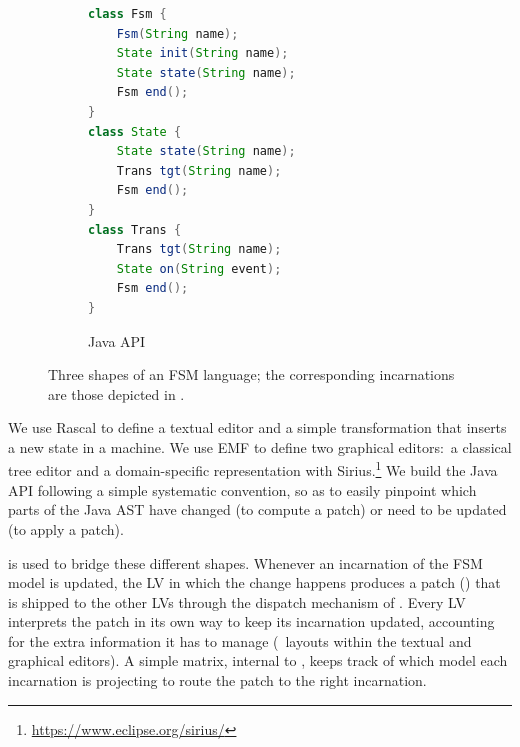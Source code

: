 \begin{figure}[bt]
	\enskip
	\vrule
	\enskip
	\begin{subfigure}[t]{.35\columnwidth}
		\vskip 0pt
		\begin{lstlisting}[label=lst:fsm-api, language=Java, numbers=none, xleftmargin=0pt, tabsize=1, aboveskip=0pt, belowskip=0pt, abovecaptionskip=0pt]
class Fsm {
	Fsm(String name);
	State init(String name);
	State state(String name);
	Fsm end();
}
class State {
	State state(String name);
	Trans tgt(String name);
	Fsm end();
}
class Trans {
	Trans tgt(String name);
	State on(String event);
	Fsm end();
}
		\end{lstlisting}
		\caption{Java API}
	\end{subfigure}
	\caption{Three shapes of an FSM language; the corresponding incarnations are those depicted in .}
	\label{fig:3fsms}
\end{figure}

We use Rascal to define a textual editor and a simple transformation that inserts a new state in a machine.
We use EMF to define two graphical editors:~a classical tree editor and a domain-specific representation with Sirius.\footnote{\url{https://www.eclipse.org/sirius/}}
We build the Java API following a simple systematic convention, so as to easily pinpoint which parts of the Java AST have changed (to compute a patch) or need to be updated (to apply a patch).

\prism is used to bridge these different shapes.
Whenever an incarnation of the FSM model is updated, the LV in which the change happens produces a patch (\cf{}) that is shipped to the other LVs through the dispatch mechanism of \prism.
Every LV interprets the patch in its own way to keep its incarnation updated, accounting for the extra information it has to manage (\eg~layouts within the textual and graphical editors).
A simple matrix, internal to \prism, keeps track of which model each incarnation is projecting to route the patch to the right incarnation.



